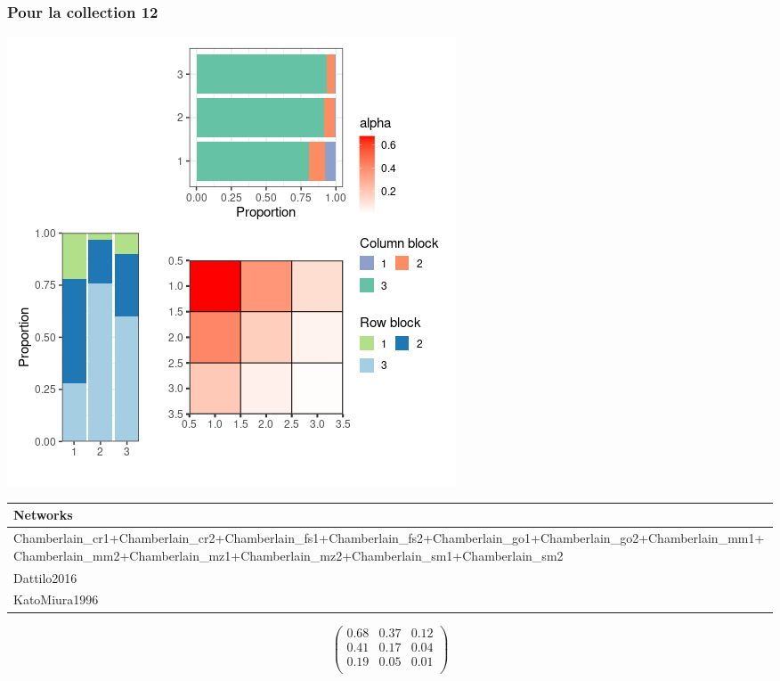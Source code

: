 \subsubsection{Pour la collection 12 }

\includegraphics{./img/63fe35c05911cc6ad732c2424d821e1ff6017bcf.png}\newline \tiny

\begin{tabular}{l}
\toprule
Networks\\
\midrule
Chamberlain\_cr1+Chamberlain\_cr2+Chamberlain\_fs1+Chamberlain\_fs2+Chamberlain\_go1+Chamberlain\_go2+Chamberlain\_mm1+Chamberlain\_mm2+Chamberlain\_mz1+Chamberlain\_mz2+Chamberlain\_sm1+Chamberlain\_sm2\\
Dattilo2016\\
KatoMiura1996\\
\bottomrule
\end{tabular}

\normalsize\newline\[\begin{pmatrix} 0.68 &0.37 &0.12 \\0.41 &0.17 &0.04 \\0.19 &0.05 &0.01 \\ \end{pmatrix}\]

